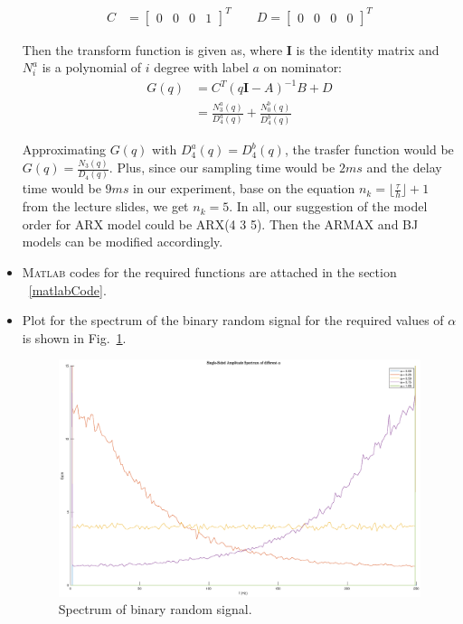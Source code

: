 \documentclass[10pt,a4paper]{article}
\begin{document}
\begin{itemize}
\begin{align}
		C &= \begin{bmatrix} 0 & 0 & 0 & 1 \end{bmatrix}^{T} \qquad D = \begin{bmatrix} 0 & 0 & 0 & 0 \end{bmatrix}^{T}
	\end{align}
	\par Then the transform function is given as, where $\mathbf{I}$ is the identity matrix and $N^{a}_{i}$ is a polynomial of $i$ degree with label $a$ on nominator:
	\begin{align}
		G(q) &= C^{T}(q \mathbf{I} - A)^{-1}B + D \\
		&= \frac{N^{a}_{3}(q)}{D^{a}_{4}(q)} + \frac{N^{b}_{0}(q)}{D^{b}_{4}(q)}
	\end{align}
	\par Approximating $G(q)$ with $D^{a}_{4}(q) = D^{b}_{4}(q)$, the trasfer function would be $G(q) = \frac{N_{3}(q)}{D_{4}(q)}$. Plus, since our sampling time would be $2ms$ and the delay time would be $9ms$ in our experiment, base on the equation $n_{k} = \lfloor\frac{\tau}{h}\rfloor + 1$ from the lecture slides, we get $n_{k} = 5$. In all, our suggestion of the model order for ARX model could be ARX(4 3 5). Then the ARMAX and BJ models can be modified accordingly.
    \item \textsc{Matlab} codes for the required functions are attached in the section ~\ref{matlabCode}.
    \item Plot for the spectrum of the binary random signal for the required values of $\alpha$ is shown in Fig.~\ref{fig:binarySpectrum}.
	\begin{figure}[ht]
		\footnotesize
		\centering 
		\includegraphics[width=0.7\columnwidth]{spectrumAlpha.eps} 
		\caption{Spectrum of binary random signal.}
		\label{fig:binarySpectrum}
	\end{figure}
\end{itemize}
\end{document}

